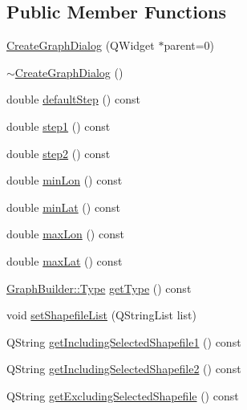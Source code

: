 \subsection*{Public Member Functions}
\begin{DoxyCompactItemize}
\item 
\mbox{\hyperlink{class_create_graph_dialog_a1ca734a0c87f3878d7d27be34246e79c}{Create\+Graph\+Dialog}} (Q\+Widget $\ast$parent=0)
\item 
\mbox{\hyperlink{class_create_graph_dialog_a438e64f943a2aa13de87f0c9f0ad712e}{$\sim$\+Create\+Graph\+Dialog}} ()
\item 
double \mbox{\hyperlink{class_create_graph_dialog_a20525eb61bbb312849c296c66f1586a6}{default\+Step}} () const
\item 
double \mbox{\hyperlink{class_create_graph_dialog_a065a3a4832854cd670f364d5869c152a}{step1}} () const
\item 
double \mbox{\hyperlink{class_create_graph_dialog_a8d71c8f8da9f7eeda61cef830a664000}{step2}} () const
\item 
double \mbox{\hyperlink{class_create_graph_dialog_aadc2d2e64b417b5f082616cb43b78db4}{min\+Lon}} () const
\item 
double \mbox{\hyperlink{class_create_graph_dialog_a3e8c37ff45a6ba735656b6a20ad83489}{min\+Lat}} () const
\item 
double \mbox{\hyperlink{class_create_graph_dialog_aa9d4bc2aa454cc181ec8897256da442c}{max\+Lon}} () const
\item 
double \mbox{\hyperlink{class_create_graph_dialog_a49c7ef65ddba7a70d6dbb792bf1993b4}{max\+Lat}} () const
\item 
\mbox{\hyperlink{class_graph_builder_ad9125786780ea834b0368c7a599bb5d9}{Graph\+Builder\+::\+Type}} \mbox{\hyperlink{class_create_graph_dialog_a1a3ad6c52e0b8d7c89fc5d750a5366bf}{get\+Type}} () const
\item 
void \mbox{\hyperlink{class_create_graph_dialog_a3f8c35dff1e9336cc33a7810e93cedc1}{set\+Shapefile\+List}} (Q\+String\+List list)
\item 
Q\+String \mbox{\hyperlink{class_create_graph_dialog_a6ec459499d860e10c17fdab32ea7464c}{get\+Including\+Selected\+Shapefile1}} () const
\item 
Q\+String \mbox{\hyperlink{class_create_graph_dialog_aa1549a83ca7a8bbd2904783b97d93837}{get\+Including\+Selected\+Shapefile2}} () const
\item 
Q\+String \mbox{\hyperlink{class_create_graph_dialog_a0017de86725e8d8829e34f93a53b20ca}{get\+Excluding\+Selected\+Shapefile}} () const

\end{DoxyCompactItemize}
